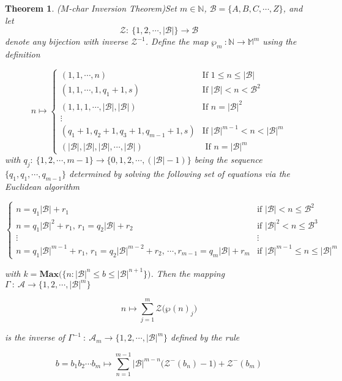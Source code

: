 \documentclass[amsmath,12pt,a4paper]{amsart}
\newtheorem{theorem}{Theorem}
\begin{document}
\begin{theorem}($M$-char Inversion Theorem)\label{Thm1}
Set $m\in \mathbb{N}$, $\mathcal{B}=\{A,B,C,\cdots, Z\}$, and let $$\mathcal{Z}:~\{1,2,\cdots, |\mathcal{B}|\}\rightarrow \mathcal{B}$$ denote any bijection with inverse $\mathcal{Z}^{-1}$. Define the map $\wp_m~:\mathbb{N}\rightarrow \mathbb{M}^m$ using the definition 

\begin{equation}\label{Eq39}
n\mapsto 
\begin{cases}
(1,1,\cdots, n) & \text{If $1\le n\le |\mathcal{B}|$}\\
(1,1,\cdots,1,q_1+1, s) & \text{If $|\mathcal{B}|<n<\mathcal{B}^2$}\\
(1,1,1,\cdots, |\mathcal{B}|, |\mathcal{B}|) & \text{If $n= |\mathcal{B}|^2$}\\
\vdots &\\
(q_1+1,q_2+1,q_3+1, q_{m-1}+1, s) & \text{If $|\mathcal{B}|^{m-1}<n<|\mathcal{B}|^m$}\\
(|\mathcal{B}|, |\mathcal{B}|, |\mathcal{B}|, \cdots, |\mathcal{B}|) & \text{ If $n=|\mathcal{B}|^m$}
\end{cases}
\end{equation}
with $q_j:~\{1,2,\cdots, m-1\}\rightarrow \{0,1,2,\cdots, (|\mathcal{B}|-1)\}$ being the sequence $\{q_1,q_1,\cdots, q_{m-1}\}$ determined by solving the following set of equations via the Euclidean algorithm 


\begin{equation}\label{Eq40}
\begin{cases}
n = q_1 |\mathcal{B}| + r_1 & \text{if } |\mathcal{B}| < n \leq \mathcal{B}^2 \\
n = q_1 |\mathcal{B}|^2 + r_1, \, r_1 = q_2 |\mathcal{B}| + r_2 & \text{if } |\mathcal{B}|^2 < n \leq \mathcal{B}^3 \\
\vdots & \vdots\\
n = q_1 |\mathcal{B}|^{m-1} + r_1, \, r_1 = q_2 |\mathcal{B}|^{m-2} + r_2, \, \cdots, r_{m-1} = q_{m} |\mathcal{B}| + r_m & \text{if } |\mathcal{B}|^{m-1} \leq n \leq |\mathcal{B}|^m
\end{cases}
\end{equation}

with $k=\textbf{Max}\biggl(\biggl\{n: |\mathcal{B}|^n\le b\le |\mathcal{B}|^{n+1}\}\biggr)$. Then the mapping $\Gamma~:~\mathcal{A} \rightarrow\{1,2,\cdots, |\mathcal{B}|^m\}$


\begin{equation}\label{Eq41}
n\mapsto \sum_{j=1}^{m}{\mathcal{Z} \biggl(\wp(n)_j\biggr)}
\end{equation}

is the inverse of $\Gamma^{-1}~:~ \mathcal{A}_m\rightarrow \{1,2,\cdots,|\mathcal{B}|^m\}$ defined by the rule 

\begin{equation}\label{Eq42}
b = b_1b_2\cdots b_m \mapsto \sum_{n=1}^{m-1}{|\mathcal{B}|^{m-n}\biggl(\mathcal{Z}^-(b_n)-1\biggr)}+\mathcal{Z}^{-}(b_m)
\end{equation}
\end{theorem}
\end{document}
